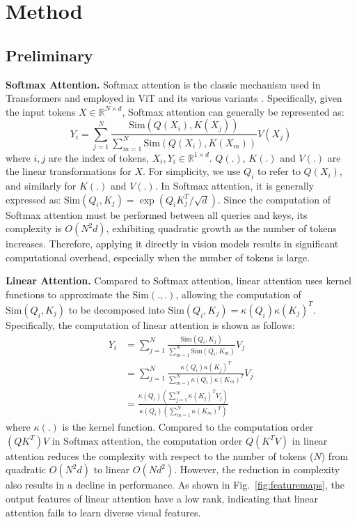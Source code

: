 \documentclass[10pt,twocolumn,letterpaper]{article}
\begin{document}
\section{Method}

\subsection{Preliminary}

\textbf{Softmax Attention.} Softmax attention is the classic mechanism used in Transformers \cite{vaswani2017attention} and employed in ViT and its various variants \cite{dong2022cswin,dosovitskiy2020image,guo2022visual,liu2021swin,wang2022crossformer}. Specifically, given the input tokens $X \in \mathbb{R}^{N \times d}$, Softmax attention can generally be represented as:
\begin{equation}
Y_i = \sum_{j=1}^{N} \frac{\mathrm{Sim}(Q(X_i), K(X_j))}{\sum_{m=1}^{N} \mathrm{Sim}(Q(X_i), K(X_m))} V(X_j)
\label{eq:softmax}
\end{equation}
where $i, j$ are the index of tokens, $X_i, Y_i \in \mathbb{R}^{1 \times d}$. $Q(.)$, $K(.)$ and $V(.)$ are the linear transformations for $X$. For simplicity, we use $Q_i$ to refer to $Q(X_i)$, and similarly for $K(.)$ and $V(.)$. In Softmax attention, it is generally expressed as: $\mathrm{Sim}(Q_i, K_j) = \exp(Q_i K_j^T / \sqrt{d})$. Since the computation of Softmax attention must be performed between all queries and keys, its complexity is $O(N^2 d)$, exhibiting quadratic growth as the number of tokens increases. Therefore, applying it directly in vision models results in significant computational overhead, especially when the number of tokens is large.

\textbf{Linear Attention.} Compared to Softmax attention, linear attention uses kernel functions to approximate the $\mathrm{Sim}(., .)$, allowing the computation of $\mathrm{Sim}(Q_i, K_j)$ to be decomposed into $\mathrm{Sim}(Q_i, K_j) = \kappa(Q_i)\kappa(K_j)^T$. Specifically, the computation of linear attention is shown as follows:
\begin{equation}
\begin{aligned}
Y_i &= \sum_{j=1}^{N} \frac{\mathrm{Sim}(Q_i, K_j)}{\sum_{m=1}^{N} \mathrm{Sim}(Q_i, K_m)} V_j \\
&= \sum_{j=1}^{N} \frac{\kappa(Q_i)\kappa(K_j)^T}{\sum_{m=1}^{N} \kappa(Q_i)\kappa(K_m)^T} V_j \\
&= \frac{\kappa(Q_i)\left(\sum_{j=1}^{N} \kappa(K_j)^T V_j\right)}{\kappa(Q_i)\left(\sum_{m=1}^{N} \kappa(K_m)^T\right)}
\end{aligned}
\label{eq:linear}
\end{equation}
where $\kappa(.)$ is the kernel function. Compared to the computation order $(QK^T)V$ in Softmax attention, the computation order $Q(K^T V)$ in linear attention reduces the complexity with respect to the number of tokens ($N$) from quadratic $O(N^2 d)$ to linear $O(N d^2)$. However, the reduction in complexity also results in a decline in performance. As shown in Fig.~\ref{fig:featuremaps}, the output features of linear attention have a low rank, indicating that linear attention fails to learn diverse visual features.
\end{document}
